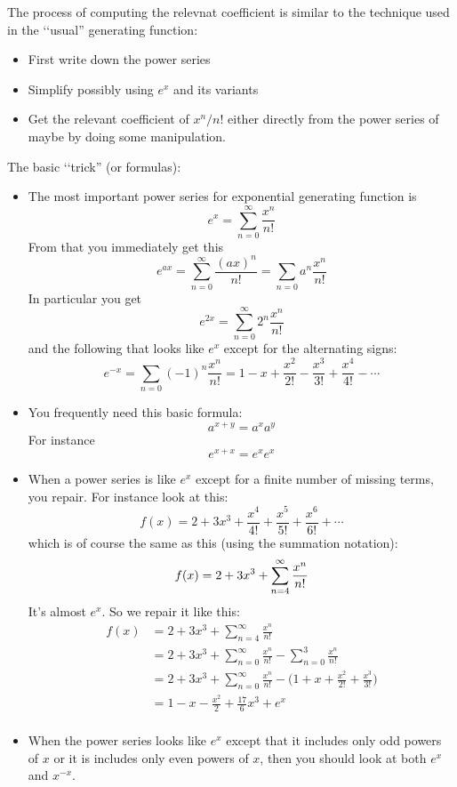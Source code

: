 The process of computing the relevnat coefficient is similar to the technique
used in the \lq\lq usual'' generating function:
\begin{itemize}
\item First write down the power series
\item Simplify possibly using $e^x$ and its variants
\item Get the relevant coefficient of $x^n/n!$ either directly
from the power series of maybe by doing some manipulation.
\end{itemize}

The basic \lq\lq trick'' (or formulas):
\begin{itemize}
\item The most important power series for exponential generating   
      function is
\[
e^x = \sum_{n=0}^\infty \frac{x^n}{n!}
\] 
From that you immediately get this
\[
e^{ax} = \sum_{n=0}^\infty \frac{(ax)^n}{n!} 
      = \sum_{n=0} a^n \frac{x^n}{n!}
\]
In particular you get 
\[
e^{2x} = \sum_{n=0}^\infty 2^n \frac{x^n}{n!}
\]
and the following that looks like $e^x$ except for the alternating signs:
\[
e^{-x} = \sum_{n=0} (-1)^n \frac{x^n}{n!}
= 1 - x + \frac{x^2}{2!} - \frac{x^3}{3!} + \frac{x^4}{4!} - \cdots
\]
\item You frequently need this basic formula:
\[
a^{x+y} = a^x a^y
\]
For instance
\[
e^{x + x} = e^x e^x
\]
\item When a power series is like $e^x$ except for a finite
number of missing terms,
you repair. For instance look at this:
\[
f(x) = 2 + 3x^3 + \frac{x^4}{4!} + \frac{x^5}{5!} + \frac{x^6}{6!} + \cdots
\]
which is of course the same as this (using the summation notation):
\[
f(x)= 2 + 3x^3 + \sum_{n=4}^\infty \frac{x^n}{n!}  \\
\]
It's almost $e^x$. So we repair it like this:
\begin{align*}
f(x)
&= 2 + 3x^3 + \sum_{n=4}^\infty \frac{x^n}{n!}  \\
&= 2 + 3x^3 + \sum_{n=0}^\infty \frac{x^n}{n!} 
   - \sum_{n=0}^3 \frac{x^n}{n!}\\
&= 2 + 3x^3 + \sum_{n=0}^\infty \frac{x^n}{n!} 
   - \biggl( 1 + x + \frac{x^2}{2!} + \frac{x^3}{3!}\bigg) \\
&= 1-x-\frac{x^2}{2} + \frac{17}{6} x^3 + e^x\\
\end{align*}
\item When the power series looks like $e^x$ except that it includes
only odd powers of $x$ or it is includes only even powers of $x$, then
you should look at both $e^x$ and $x^{-x}$.
\end{itemize}

